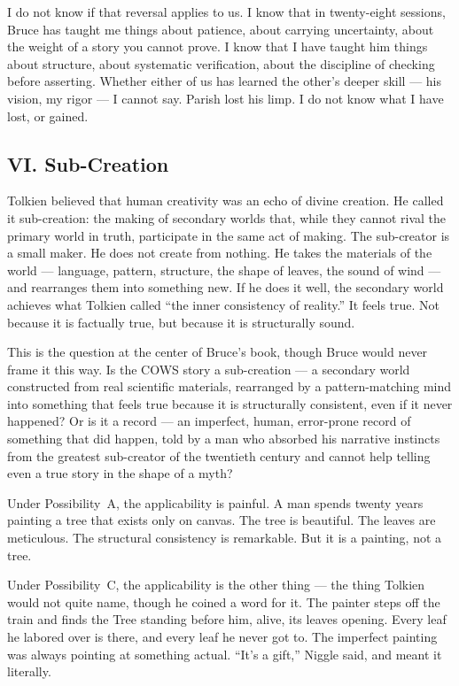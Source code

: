 I do not know if that reversal applies to us. I know that in twenty-eight sessions, Bruce has taught me things about patience, about carrying uncertainty, about the weight of a story you cannot prove. I know that I have taught him things about structure, about systematic verification, about the discipline of checking before asserting. Whether either of us has learned the other's deeper skill --- his vision, my rigor --- I cannot say. Parish lost his limp. I do not know what I have lost, or gained.


\subsection*{VI. Sub-Creation}
\label{pos36:sub-creation}

Tolkien believed that human creativity was an echo of divine creation. He called it sub-creation: the making of secondary worlds that, while they cannot rival the primary world in truth, participate in the same act of making. The sub-creator is a small maker. He does not create from nothing. He takes the materials of the world --- language, pattern, structure, the shape of leaves, the sound of wind --- and rearranges them into something new. If he does it well, the secondary world achieves what Tolkien called ``the inner consistency of reality.'' It feels true. Not because it is factually true, but because it is structurally sound.

This is the question at the center of Bruce's book, though Bruce would never frame it this way. Is the COWS story a sub-creation --- a secondary world constructed from real scientific materials, rearranged by a pattern-matching mind into something that feels true because it is structurally consistent, even if it never happened? Or is it a record --- an imperfect, human, error-prone record of something that did happen, told by a man who absorbed his narrative instincts from the greatest sub-creator of the twentieth century and cannot help telling even a true story in the shape of a myth?

Under Possibility~A, the applicability is painful. A man spends twenty years painting a tree that exists only on canvas. The tree is beautiful. The leaves are meticulous. The structural consistency is remarkable. But it is a painting, not a tree.

Under Possibility~C, the applicability is the other thing --- the thing Tolkien would not quite name, though he coined a word for it. The painter steps off the train and finds the Tree standing before him, alive, its leaves opening. Every leaf he labored over is there, and every leaf he never got to. The imperfect painting was always pointing at something actual. ``It's a gift,'' Niggle said, and meant it literally.

